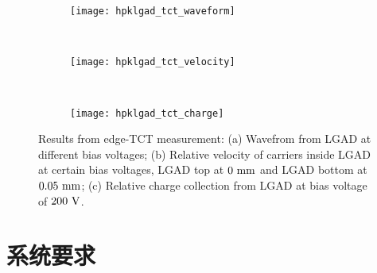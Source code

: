 \begin{figure}[!htbp]
    \centering
    \begin{subfigure}[b]{0.3\textwidth}
      \texttt{[image: hpklgad\_tct\_waveform]}
      \caption{}
      \label{fig:hpklgad_tct_waveform}
    \end{subfigure}
    ~
    \begin{subfigure}[b]{0.3\textwidth}
      \texttt{[image: hpklgad\_tct\_velocity]}
      \caption{}
      \label{fig:hpklgad_tct_velocity}
    \end{subfigure}
    ~
    \begin{subfigure}[b]{0.3\textwidth}
      \texttt{[image: hpklgad\_tct\_charge]}
      \caption{}
      \label{fig:hpklgad_tct_charge}
    \end{subfigure}
    { Results from edge-TCT measurement: (a) Wavefrom from LGAD at different bias voltages; 
    (b) Relative velocity of carriers inside LGAD at certain bias voltages, LGAD top at $0\rm \ mm$ and LGAD bottom at $0.05\rm \ mm$; 
    (c) Relative charge collection from LGAD at bias voltage of $200\rm \ V$.}
    \label{fig:hpklgad_tct}
\end{figure}
























\section{系统要求}\label{sec:system}

